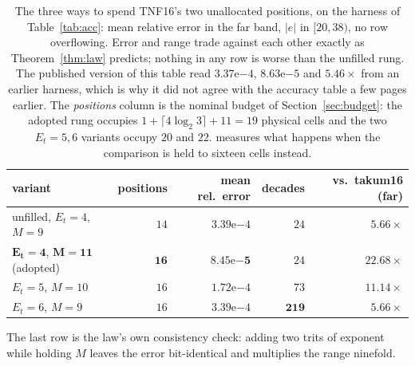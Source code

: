 \begin{table}[t]\centering
\caption{The three ways to spend TNF16's two unallocated positions, on the
harness of Table~\ref{tab:acc}: mean relative error in the far band, $|e|$ in
$[20,38)$, no row overflowing. Error and range trade against each other exactly
as Theorem~\ref{thm:law} predicts; nothing in any row is worse than the unfilled
rung. The published version of this table read $3.37\mathrm{e}{-4}$,
$8.63\mathrm{e}{-5}$ and $5.46\times$ from an earlier harness, which is why it did
not agree with the accuracy table a few pages earlier. The \emph{positions} column
is the nominal budget of Section~\ref{sec:budget}: the adopted rung occupies
$1+\lceil 4\log_2 3\rceil+11=19$ physical cells and the two $E_t{=}5,6$ variants
occupy $20$ and $22$.  measures what happens when the
comparison is held to sixteen cells instead.}
\label{tab:tnf16-fill}
\begin{tabular}{lrrrr}
\toprule
variant & positions & mean rel.\ error & decades & vs.\ takum16 (far) \\
\midrule
unfilled, $E_t{=}4$, $M{=}9$  & $14$ & $3.39\mathrm{e}{-4}$ & $24$  & $5.66\times$ \\
$\mathbf{E_t{=}4}$, $\mathbf{M{=}11}$ (adopted) & $\mathbf{16}$ & $\mathbf{8.45\mathrm{e}{-5}}$ & $24$ & $\mathbf{22.68\times}$ \\
$E_t{=}5$, $M{=}10$           & $16$ & $1.72\mathrm{e}{-4}$ & $73$  & $11.14\times$ \\
$E_t{=}6$, $M{=}9$            & $16$ & $3.39\mathrm{e}{-4}$ & $\mathbf{219}$ & $5.66\times$ \\
\bottomrule
\end{tabular}
\end{table}

The last row is the law's own consistency check: adding two trits of exponent
while holding $M$ leaves the error bit-identical and multiplies the range
ninefold.

